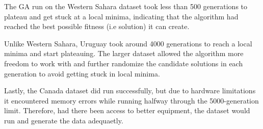 The GA run on the Western Sahara dataset took less than 500 generations to plateau and get stuck at a local minima, indicating that the algorithm had reached the best possible fitness (i.e solution) it can create. 

Unlike Western Sahara, Uruguay took around 4000 generations to reach a local minima and start plateauing. The larger dataset allowed the algorithm more freedom to work with and further randomize the candidate solutions in each generation to avoid getting stuck in local minima. 

Lastly, the Canada dataset did run successfully, but due to hardware limitations it encountered memory errors while running halfway through the 5000-generation limit. Therefore, had there been access to better equipment, the dataset would run and generate the data adequaetly.
